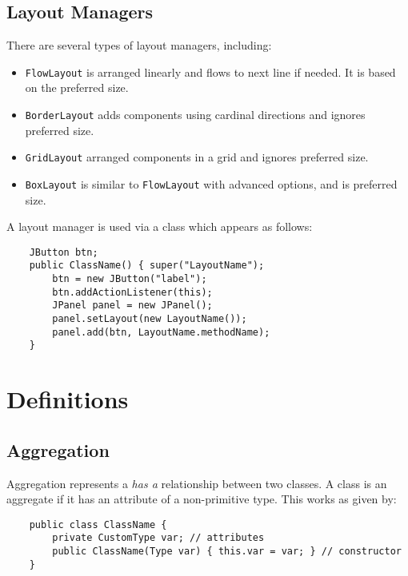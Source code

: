 \documentclass[letterpaper, openany, justified]{tufte-book}
\newcommand{\cd}[1]{\lstinline{#1}}
\begin{document}
\begin{fullwidth}
\section{Layout Managers}
There are several types of layout managers, including:
\begin{itemize}
    \item \cd{FlowLayout} is arranged linearly and flows to next line if needed. It is based on the preferred size.
    \item \cd{BorderLayout} adds components using cardinal directions and ignores preferred size.
    \item \cd{GridLayout} arranged components in a grid and ignores preferred size.
    \item \cd{BoxLayout} is similar to \cd{FlowLayout} with advanced options, and is preferred size.
\end{itemize}
A layout manager is used via a class which appears as follows:
\begin{lstlisting}
    JButton btn;
    public ClassName() { super("LayoutName");
        btn = new JButton("label");
        btn.addActionListener(this);
        JPanel panel = new JPanel();
        panel.setLayout(new LayoutName());
        panel.add(btn, LayoutName.methodName);
    }
\end{lstlisting}

\chapter{Definitions}

\section{Aggregation}
Aggregation represents a \textit{has a} relationship between two classes. A class is an aggregate if it has an attribute of a non-primitive type. This works as given by:
\begin{lstlisting}
    public class ClassName {
        private CustomType var; // attributes
        public ClassName(Type var) { this.var = var; } // constructor
    }


\end{lstlisting}
\end{fullwidth}
\end{document}
